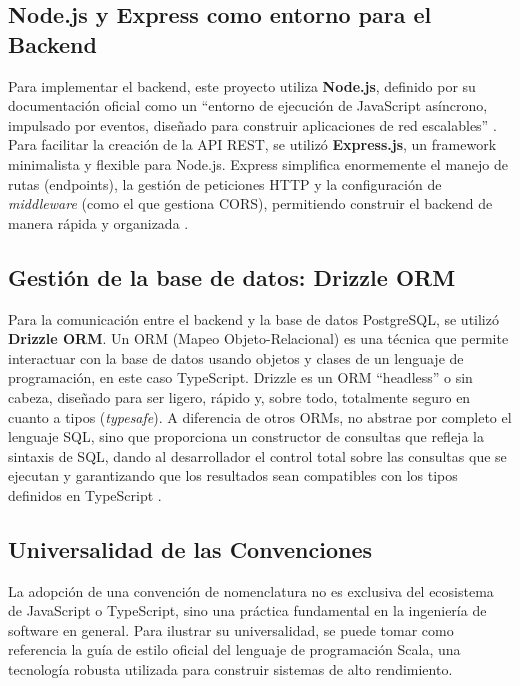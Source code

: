 \documentclass[12pt,letterpaper,spanish]{report}
\begin{document}
\subsection{Node.js y Express como entorno para el Backend}
\label{sec:nodejs_express_backend}
Para implementar el backend, este proyecto utiliza \textbf{Node.js}, definido por su documentación oficial como un ``entorno de ejecución de JavaScript asíncrono, impulsado por eventos, diseñado para construir aplicaciones de red escalables'' \citep{NodeDocs2025}. Para facilitar la creación de la API REST, se utilizó \textbf{Express.js}, un framework minimalista y flexible para Node.js. Express simplifica enormemente el manejo de rutas (endpoints), la gestión de peticiones HTTP y la configuración de \textit{middleware} (como el que gestiona CORS), permitiendo construir el backend de manera rápida y organizada \citep{ExpressDocs}.

\subsection{Gestión de la base de datos: Drizzle ORM}
\label{sec:drizzle_orm}
Para la comunicación entre el backend y la base de datos PostgreSQL, se utilizó \textbf{Drizzle ORM}. Un ORM (Mapeo Objeto-Relacional) es una técnica que permite interactuar con la base de datos usando objetos y clases de un lenguaje de programación, en este caso TypeScript. Drizzle es un ORM ``headless'' o sin cabeza, diseñado para ser ligero, rápido y, sobre todo, totalmente seguro en cuanto a tipos (\textit{typesafe}). A diferencia de otros ORMs, no abstrae por completo el lenguaje SQL, sino que proporciona un constructor de consultas que refleja la sintaxis de SQL, dando al desarrollador el control total sobre las consultas que se ejecutan y garantizando que los resultados sean compatibles con los tipos definidos en TypeScript \citep{DrizzleOrmDocs}.

\subsection{Universalidad de las Convenciones}
\label{sec:convenciones_scala}

La adopción de una convención de nomenclatura no es exclusiva del ecosistema de JavaScript o TypeScript, sino una práctica fundamental en la ingeniería de software en general. Para ilustrar su universalidad, se puede tomar como referencia la guía de estilo oficial del lenguaje de programación Scala, una tecnología robusta utilizada para construir sistemas de alto rendimiento.
\end{document}
